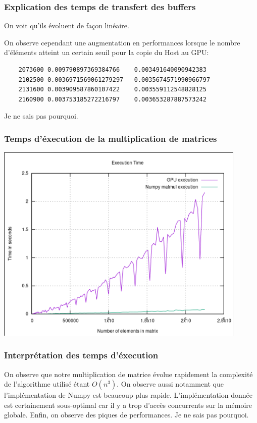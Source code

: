 \documentclass[8pt]{beamer}
\begin{document}
\begin{frame}[fragile]
    \frametitle{Explication des temps de transfert des buffers}
    On voit qu'ils évoluent de façon linéaire.

    On observe cependant une augmentation en performances lorsque le nombre 
    d'éléments atteint un certain seuil pour la copie du Host au GPU:\@
    \begin{lstlisting}
    2073600	0.009790897369384766	0.003491640090942383
    2102500	0.0036971569061279297	0.0035674571990966797
    2131600	0.003909587860107422	0.003559112548828125
    2160900	0.003753185272216797	0.003653287887573242
    \end{lstlisting}
    \vspace{20pt}
    Je ne sais pas pourquoi.
\end{frame}

\begin{frame}
    \frametitle{Temps d'éxecution de la multiplication de matrices}
    \begin{center}
    \includegraphics[width=0.9\textwidth]{../resources/matrix_naive_execution_time.pdf}
    \end{center}
\end{frame}

\begin{frame}
    \frametitle{Interprétation des temps d'éxecution}
    On observe que notre multiplication de matrice évolue rapidement 
    la complexité de l'algorithme utilisé étant $O(n^3)$.
    \vspace{20pt}
    \newline
    On observe aussi notamment que l'implémentation de Numpy est beaucoup 
    plus rapide. L'implémentation donnée est certainement sous-optimal car 
    il y a trop d'accès concurrents sur la mémoire globale.
    \vspace{20pt}
    \newline
    Enfin, on observe des piques de performances. Je ne sais pas pourquoi.
\end{frame}
\end{document}
